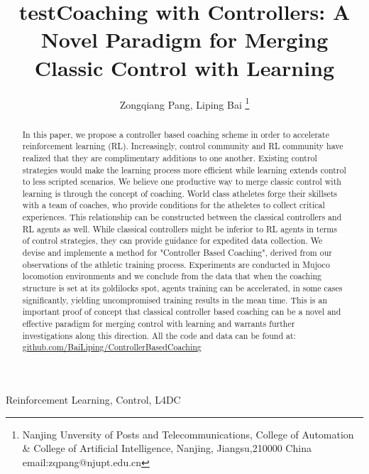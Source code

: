 \documentclass[journal]{IEEEtran}
\begin{document}
    \title{test}
\title{Coaching with Controllers: A Novel Paradigm for Merging Classic Control with Learning}

\author{ Zongqiang Pang, Liping Bai \thanks{Nanjing Unversity of Posts and Telecommunications, College of Automation \& College of Artificial Intelligence, Nanjing, Jiangsu,210000 China email:zqpang@njupt.edu.cn}}
\maketitle
\begin{abstract}
In this paper, we propose a controller based coaching scheme in order to accelerate reinforcement learning (RL). Increasingly, control community and RL community have realized that they are complimentary additions to one another. Existing control strategies would make the learning process more efficient while learning extends control to less scripted scenarios. We believe one productive way to merge classic control with learning is through the concept of coaching. World class atheletes forge their skillsets with a team of coaches, who provide conditions for the atheletes to collect critical experiences. This relationship can be constructed between the classical controllers and RL agents as well. While classical controllers might be inferior to RL agents in terms of control strategies, they can provide guidance for expedited data collection. We devise and implemente a method for "Controller Based Coaching", derived from our observations of the athletic training process. Experiments are conducted in Mujoco locomotion environments and we conclude from the data that when the coaching structure is set at its goldilocks spot, agents training can be accelerated, in some cases significantly, yielding uncompromised training results in the mean time. This is an important proof of concept that classical controller based coaching can be a novel and effective paradigm for merging control with learning and warrants further investigations along this direction. All the code and data can be found at: \href{https://github.com/BaiLiping/ControllerBasedCoaching}{github.com/BaiLiping/ControllerBasedCoaching}
\end{abstract}
\begin{IEEEkeywords}
Reinforcement Learning, Control, L4DC
\end{IEEEkeywords}
\IEEEpeerreviewmaketitle
\end{document}
